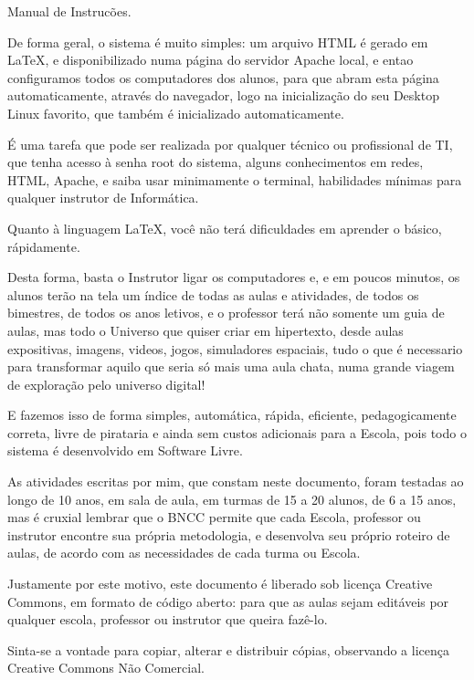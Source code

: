 
\LARGE Manual de Instrucões.

		\begin{multicols}{2}
	
	\normalsize	De forma geral, o sistema é muito simples: um arquivo HTML é gerado em \LaTeX, e disponibilizado  numa página do servidor Apache local, e entao configuramos todos os computadores dos alunos, para que abram esta página automaticamente, através do navegador, logo na inicialização do seu Desktop Linux favorito, que também é inicializado automaticamente.
	
	É uma tarefa que pode ser realizada por qualquer técnico ou profissional de TI, que tenha acesso à senha root do sistema, alguns conhecimentos em redes, HTML, Apache, e saiba usar minimamente o terminal, habilidades mínimas para qualquer instrutor de Informática.
	
	Quanto à linguagem \LaTeX, você não terá dificuldades em aprender o básico, rápidamente.
	
	Desta forma, basta o Instrutor ligar os computadores e, e em poucos minutos, os alunos terão na tela um índice de todas as aulas e atividades, de todos  os bimestres, de todos os anos letivos, e o professor terá não somente um guia de aulas, mas todo o Universo que quiser criar em hipertexto, desde aulas expositivas, imagens, videos, jogos, simuladores espaciais, tudo o que é necessario para transformar aquilo que seria só mais uma aula chata, numa grande viagem de exploração pelo universo digital!
	
	E fazemos isso de forma simples, automática, rápida, eficiente, pedagogicamente correta, livre de pirataria e ainda sem custos adicionais para a Escola, pois todo o sistema é desenvolvido em Software Livre.
	
	As atividades escritas por mim, que constam neste documento, foram testadas ao longo de 10 anos, em sala de aula, em turmas de 15 a 20 alunos, de 6 a 15 anos, mas é cruxial lembrar que o BNCC permite que cada Escola, professor ou instrutor encontre sua própria metodologia, e desenvolva seu próprio roteiro de aulas, de acordo com as necessidades de cada turma ou Escola.
	
	Justamente por este motivo, este documento é liberado sob licença Creative Commons, em formato de código aberto: para que as aulas sejam editáveis por qualquer escola, professor ou instrutor que queira fazê-lo.
	
	Sinta-se a vontade para copiar, alterar e distribuir cópias, observando a licença Creative Commons Não Comercial.
	

\end{multicols}
